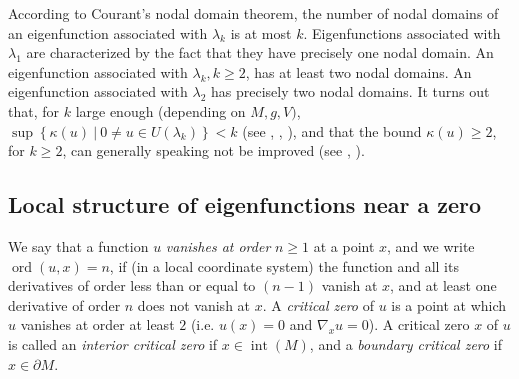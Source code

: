 \documentclass[12pt,a4paper]{amsart}
\theoremstyle{plain} %
\theoremstyle{definition}
\numberwithin{equation}{section}
\numberwithin{figure}{section}
\numberwithin{table}{section}
\DeclareMathOperator{\inte}{int}
\DeclareMathOperator{\ord}{ord}
\newcommand{\set}[1]{\left\lbrace #1 \right\rbrace}
\begin{document}
According to Courant's nodal domain theorem, the number of nodal domains of an eigenfunction associated with $\lambda_k$ is at most $k$. Eigenfunctions associated with $\lambda_1$ are characterized by the fact that they have precisely one nodal domain. An eigenfunction associated with $\lambda_k, k\ge 2$, has at least two nodal domains. An eigenfunction associated with $\lambda_2$ has precisely two nodal domains. It turns out that, for $k$ large enough (depending on $M, g, V)$, $\sup\set{\kappa(u) ~|~ 0 \not = u \in U(\lambda_k)} < k$ (see \cite{Plej1956}, \cite{Polt2009}, \cite{Lena2019}), and that the bound $\kappa(u) \ge 2$, for $k \ge 2$, can generally speaking not be improved (see \cite{Ster1925,Lewy1977}, \cite{BeHe2015s,BeHe2015r}). \medskip


\subsection{Local structure of eigenfunctions near a zero}\label{SS-evp2}

We say that a function $u$ \emph{vanishes at order} $n \ge 1$ at a point $x$, and we write $\ord(u,x) = n$, if (in a local coordinate system) the function and all its derivatives of order less than or equal to $(n-1)$ vanish at $x$, and at least one derivative of order $n$ does not vanish at $x$. A \emph{critical zero} of $u$ is a point at which $u$ vanishes at order at least $2$ (i.e. $u(x)=0$ and $\nabla_x u = 0$). A critical zero $x$ of $u$ is called an \emph{interior critical zero} if $x \in \inte(M)$, and a \emph{boundary critical zero} if $x \in \partial M$.
\end{document}
